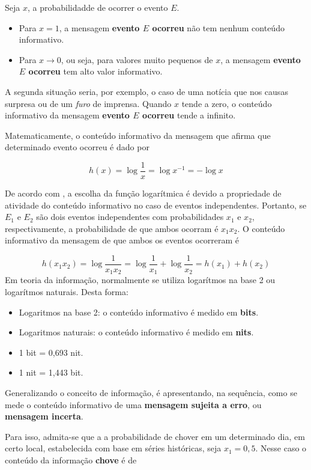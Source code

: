 \documentclass[
]{book}
\begin{document}
Seja \(x\), a probabilidadde de ocorrer o evento \(E\).

\begin{itemize}
\item
  Para \(x=1\), a mensagem \textbf{evento \(E\) ocorreu} não tem nenhum conteúdo informativo.
\item
  Para \(x \rightarrow 0\), ou seja, para valores muito pequenos de \(x\), a mensagem \textbf{evento \(E\) ocorreu} tem alto valor informativo.
\end{itemize}

A segunda situação seria, por exemplo, o caso de uma notícia que nos causas surpresa ou de um \emph{furo} de imprensa. Quando \(x\) tende a zero, o conteúdo informativo da mensagem \textbf{evento \(E\) ocorreu} tende a infinito.

Matematicamente, o conteúdo informativo da mensagem que afirma que determinado evento ocorreu é dado por

\[
  h(x) = \log \dfrac{1}{x} = \log x^{-1} = - \log x
  \label{eq:ConteudoInformativo}
\]

De acordo com \citet{Hoffmann2006}, a escolha da função logarítmica é devido a propriedade de atividade do conteúdo informativo no caso de eventos independentes. Portanto, se \(E_1\) e \(E_2\) são dois eventos independentes com probabilidades \(x_1\) e \(x_2\), respectivamente, a probabilidade de que ambos ocorram é \(x_1x_2\). O conteúdo informativo da mensagem de que ambos os eventos ocorreram é

\[
  h(x_1x_2) = \log \dfrac{1}{x_1x_2} = \log\dfrac{1}{x_1} + \log \dfrac{1}{x_2} = h(x_1) + h(x_2)
\]
Em teoria da informação, normalmente se utiliza logarítmos na base 2 ou logarítmos naturais. Desta forma:

\begin{itemize}
\item
  Logaritmos na base 2: o conteúdo informativo é medido em \textbf{bits}.
\item
  Logaritmos naturais: o conteúdo informativo é medido em \textbf{nits}.
\item
  1 bit = 0,693 nit.
\item
  1 nit = 1,443 bit.
\end{itemize}

Generalizando o conceito de informação, é apresentando, na sequência, como se mede o conteúdo informativo de uma \textbf{mensagem sujeita a erro}, ou \textbf{mensagem incerta}.

Para isso, admita-se que a a probabilidade de chover em um determinado dia, em certo local, estabelecida com base em séries históricas, seja \(x_1 = 0,5\). Nesse caso o conteúdo da informação \textbf{chove} é de
\end{document}
